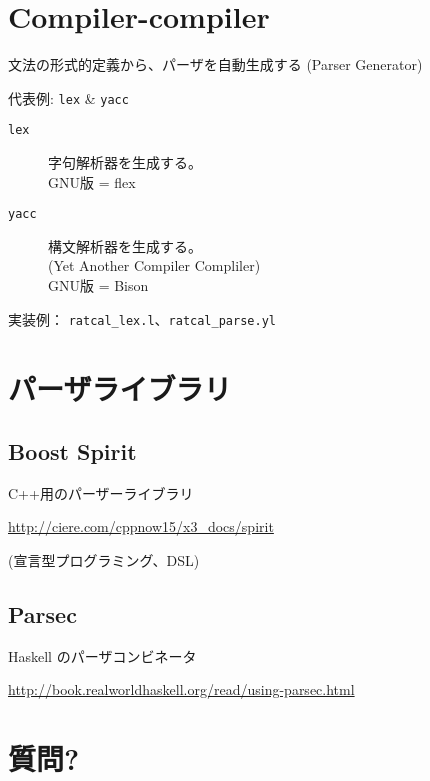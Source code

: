 \documentclass[slide,papersize,fleqn,22pt]{jsarticle}
\begin{document}
\section{Compiler-compiler}
\footnotesize
文法の形式的定義から、パーザを自動生成する (Parser Generator)

代表例: \texttt{lex} \& \texttt{yacc}
\begin{description}
\item[\texttt{lex}] 字句解析器を生成する。\\
  GNU版 = flex
\item[\texttt{yacc}] 構文解析器を生成する。 \\
  (Yet Another Compiler Compliler) \\
  GNU版 = Bison
\end{description}

実装例： \texttt{ratcal\_lex.l}、\texttt{ratcal\_parse.yl}

\section{パーザライブラリ}
\subsection{Boost Spirit}
C++用のパーザーライブラリ

\url{http://ciere.com/cppnow15/x3_docs/spirit}

{\tiny (宣言型プログラミング、DSL)}

\subsection{Parsec}
Haskell のパーザコンビネータ

{\footnotesize \url{http://book.realworldhaskell.org/read/using-parsec.html}}

\section{質問?}
\end{document}
